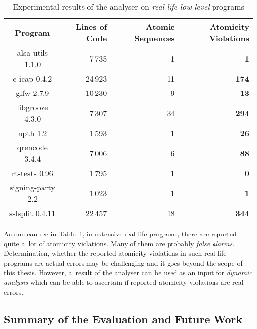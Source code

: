 \begin{table}[hbt]
    \centering

    \begin{tabular}{|c||r|r|r|}
        \hline
        Program & Lines of Code & Atomic Sequences
            & \textbf{Atomicity Violations} \\ \hline \hline

        alsa-utils 1.1.0 & 7\,735 & 1 & \textbf{1} \\ \hline
        c-icap 0.4.2 & 24\,923 & 11 & \textbf{174} \\ \hline
        glfw 2.7.9 & 10\,230 & 9 & \textbf{13} \\ \hline
        libgroove 4.3.0 & 7\,307 & 34 & \textbf{294} \\ \hline
        npth 1.2 & 1\,593 & 1 & \textbf{26} \\ \hline
        qrencode 3.4.4 & 7\,006 & 6 & \textbf{88} \\ \hline
        rt-tests 0.96 & 1\,795 & 1 & \textbf{0} \\ \hline
        signing-party 2.2 & 1\,023 & 1 & \textbf{1} \\ \hline
        sslsplit 0.4.11 & 22\,457 & 18 & \textbf{344} \\ \hline
    \end{tabular}

    \caption{%
        Experimental results of the analyser on \emph{real-life
        low-level} programs
    }
    \label{tab:exp}
\end{table}

As one can see in Table~\ref{tab:exp}, in extensive real-life programs,
there are reported quite a~lot of atomicity violations. Many of them are
probably \emph{false alarms}. Determination, whether the reported
atomicity violations in such real-life programs are actual errors may be
challenging and it goes beyond the scope of this thesis. However, a~result
of the analyser can be used as an input for \emph{dynamic analysis} which
can be able to ascertain if reported atomicity violations are real errors.


\subsection{Summary of the Evaluation and Future Work}
\label{sec:expSum}

